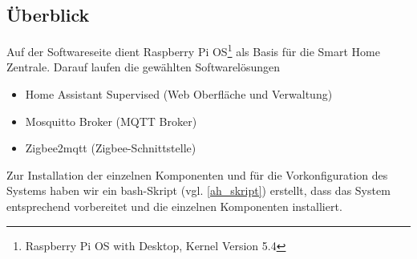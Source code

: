 \subsection{Überblick}\label{sw_ueberblick}
Auf der Softwareseite dient Raspberry Pi OS\footnote{Raspberry Pi OS with Desktop, Kernel Version 5.4} als Basis für die Smart Home Zentrale.
Darauf laufen die gewählten Softwarelösungen
\begin{itemize}
\item Home Assistant Supervised (Web Oberfläche und Verwaltung)
\item Mosquitto Broker (MQTT Broker)
\item Zigbee2mqtt (Zigbee-Schnittstelle)
\end{itemize}
\noindent Zur Installation der einzelnen Komponenten und für die Vorkonfiguration des Systems haben wir ein bash-Skript (vgl. \ref{ah_skript}) erstellt, dass das System entsprechend vorbereitet und die einzelnen Komponenten installiert.